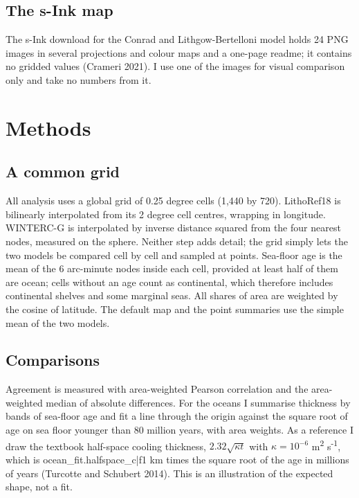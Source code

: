 \documentclass[11pt,a4paper]{article}
\begin{document}
\subsection{The s-Ink map}

The s-Ink download for the Conrad and Lithgow-Bertelloni model holds 24 PNG images in several projections and colour maps and a one-page readme; it contains no gridded values (Crameri 2021). I use one of the images for visual comparison only and take no numbers from it.

\section{Methods}

\subsection{A common grid}

All analysis uses a global grid of 0.25 degree cells (1,440 by 720). LithoRef18 is bilinearly interpolated from its 2 degree cell centres, wrapping in longitude. WINTERC-G is interpolated by inverse distance squared from the four nearest nodes, measured on the sphere. Neither step adds detail; the grid simply lets the two models be compared cell by cell and sampled at points. Sea-floor age is the mean of the 6 arc-minute nodes inside each cell, provided at least half of them are ocean; cells without an age count as continental, which therefore includes continental shelves and some marginal seas. All shares of area are weighted by the cosine of latitude. The default map and the point summaries use the simple mean of the two models.

\subsection{Comparisons}

Agreement is measured with area-weighted Pearson correlation and the area-weighted median of absolute differences. For the oceans I summarise thickness by bands of sea-floor age and fit a line through the origin against the square root of age on sea floor younger than 80 million years, with area weights. As a reference I draw the textbook half-space cooling thickness, $2.32\sqrt{\kappa t}$ with $\kappa = 10^{-6}$ m\textsuperscript{2} s\textsuperscript{-1}, which is {{ocean_fit.halfspace_c|f1}} km times the square root of the age in millions of years (Turcotte and Schubert 2014). This is an illustration of the expected shape, not a fit.
\end{document}
